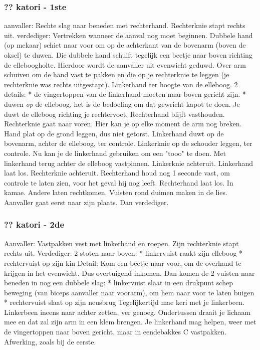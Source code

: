 \subsubsection{?? katori - 1ste}
aanvaller:
Rechte slag naar beneden met rechterhand.
Rechterknie stapt rechts uit.
verdediger:
Vertrekken wanneer de aanval nog moet beginnen.
Dubbele hand (op mekaar) schiet naar voor om op de achterkant van de bovenarm (boven de oksel) te duwen.
Die dubbele hand schuift tegelijk een beetje naar boven richting de elleboogholte.
Hierdoor wordt de aanvaller uit evenwicht geduwd.
Over arm schuiven om de hand vast te pakken en die op je rechterknie te leggen (je rechterknie was rechts uitgestapt).
Linkerhand ter hoogte van de elleboog.
2 details:
* de vingertoppen van de linkerhand moeten naar boven gericht zijn.
* duwen \textit{op} de elleboog, het is de bedoeling om dat gewricht kapot te doen.
Je duwt de elleboog richting je rechtervoet.
Rechterhand blijft vasthouden. Rechterknie gaat naar voren. Hier kan je op elke moment de arm nog breken.
Hand plat op de grond leggen, dus niet getorst.
Linkerhand duwt op de bovenarm, achter de elleboog, ter controle.
Linkerknie op de schouder leggen, ter controle.
Nu kan je de linkerhand gebruiken om een "tooo" te doen.
Met linkerhand terug achter de elleboog vastpinnen.
Linkerknie achteruit.
Linkerhand laat los.
Rechterknie achteruit.
Rechterhand houd nog 1 seconde vast, om controle te laten zien, voor het geval hij nog leeft.
Rechterhand laat los.
In kamae.
Andere laten rechtkomen.
Vuisten rond duimen maken in de lies.
Aanvaller gaat eerst naar zijn plaats.
Dan verdediger.

\subsubsection{?? katori - 2de}
Aanvaller:
Vastpakken vest met linkerhand en roepen.
Zijn rechterknie stapt rechts uit.
Verdediger:
2 stoten naar boven:
* linkervuist raakt zijn elleboog
* rechtervuist op zijn kin
Detail: Kom een beetje naar voor, om de overhand te krijgen in het evenwicht. Dus overtuigend inkomen.
Dan komen de 2 vuisten naar beneden in nog een dubbele slag:
* linkervuist slaat in een drukpunt schep beweging (van biceps aanvaller naar voorarm), om hem naar voor te laten buigen
* rechtervuist slaat op zijn neusbrug
Tegelijkertijd mae keri met je linkerbeen.
Linkerbeen ineens naar achter zetten, ver genoeg.
Ondertussen draait je lichaam mee en dat zal zijn arm in een klem brengen.
Je linkerhand mag helpen, weer met de vingertoppen naar boven gericht, maar in eendebakkes C vastpakken.
Afwerking, zoals bij de eerste.

